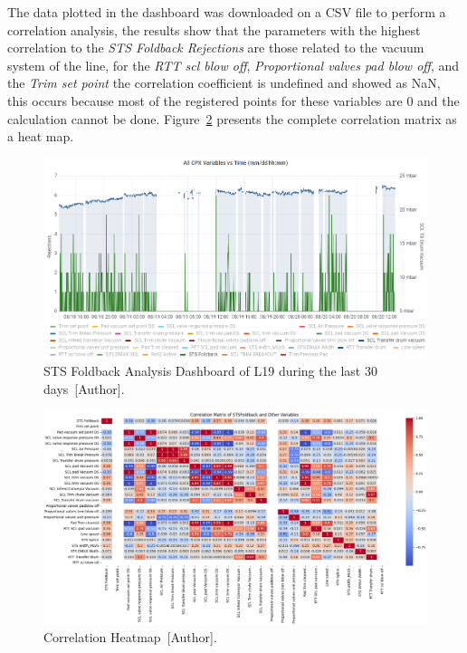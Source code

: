 The data plotted in the dashboard was downloaded on a CSV file to perform a correlation analysis, the results show that the parameters with the highest correlation to the \textit{STS Foldback Rejections} are those related to the vacuum system of the line, for the \textit{ RTT scl blow off}, \textit{Proportional valves pad blow off}, and the \textit{Trim set point} the correlation coefficient is undefined and showed as NaN, this occurs because most of the registered points for these variables are $0$ and the calculation cannot be done. Figure~\ref{corr} presents the complete correlation matrix as a heat map.

\begin{figure}[H]
    \centering
    \includegraphics[width=1\linewidth, height = 0.3\textheight]{FIGURES/STSAnalysis1.png}
    \caption{STS Foldback Analysis Dashboard of L19 during the last 30 days~[Author].}
    \label{STSanalysis}
\end{figure}
\begin{figure}[H]
    \centering
    \includegraphics[width=1\linewidth, height = 0.55\textheight]{FIGURES/heatmap.png}
    \caption{Correlation Heatmap~[Author].}
    \label{corr}
\end{figure}
